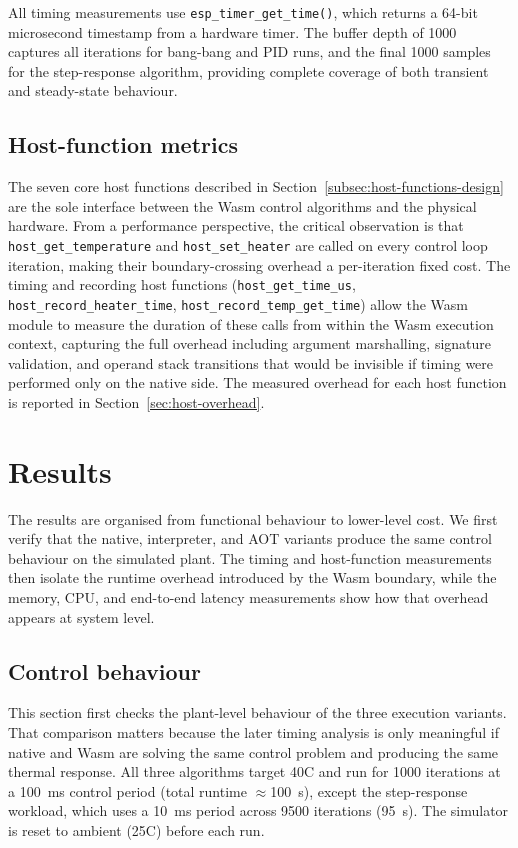 \documentclass[12pt, a4paper]{report}
\begin{document}
All timing measurements use \texttt{esp\_timer\_get\_time()}, which returns a 64-bit microsecond timestamp from a hardware timer. The buffer depth of 1000 captures all iterations for bang-bang and PID runs, and the final 1000 samples for the step-response algorithm, providing complete coverage of both transient and steady-state behaviour.

\subsection{Host-function metrics}
\label{subsec:host-function-overhead}

The seven core host functions described in Section~\ref{subsec:host-functions-design} are the sole interface between the Wasm control algorithms and the physical hardware. From a performance perspective, the critical observation is that \texttt{host\_get\_temperature} and \texttt{host\_set\_heater} are called on every control loop iteration, making their boundary-crossing overhead a per-iteration fixed cost. The timing and recording host functions (\texttt{host\_get\_time\_us}, \texttt{host\_record\_heater\_time}, \texttt{host\_record\_temp\_get\_time}) allow the Wasm module to measure the duration of these calls from within the Wasm execution context, capturing the full overhead including argument marshalling, signature validation, and operand stack transitions that would be invisible if timing were performed only on the native side. The measured overhead for each host function is reported in Section~\ref{sec:host-overhead}.

\section{Results}
\label{sec:perf-results}

The results are organised from functional behaviour to lower-level cost. We first verify that the native, interpreter, and AOT variants produce the same control behaviour on the simulated plant. The timing and host-function measurements then isolate the runtime overhead introduced by the Wasm boundary, while the memory, CPU, and end-to-end latency measurements show how that overhead appears at system level.

\subsection{Control behaviour}
\label{sec:algo-temp-response}

This section first checks the plant-level behaviour of the three execution variants. That comparison matters because the later timing analysis is only meaningful if native and Wasm are solving the same control problem and producing the same thermal response. All three algorithms target 40\textdegree C and run for 1000 iterations at a 100~ms control period (total runtime $\approx$100~s), except the step-response workload, which uses a 10~ms period across 9500 iterations (95~s). The simulator is reset to ambient (25\textdegree C) before each run.
\end{document}
